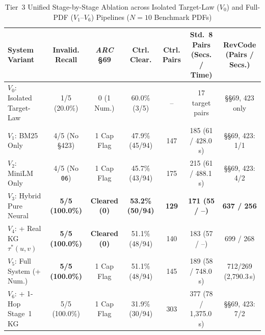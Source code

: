 \begin{table}[htbp]
    \centering
    \scriptsize
    \setlength{\tabcolsep}{2.0pt}
    \renewcommand{\arraystretch}{0.92}
    \caption[Tier 3 Stage-by-Stage Full-PDF Ablation Matrix]{Tier~3 Unified Stage-by-Stage Ablation across Isolated Target-Law ($V_0$) and Full-PDF ($V_1$--$V_6$) Pipelines ($N = 10$ Benchmark PDFs)}
    \label{tab:tier3_ablation_matrix}
    \begin{tabularx}{\linewidth}{>{\RaggedRight\arraybackslash}Xcccccc}
        \toprule
        \textbf{System Variant} & \shortstack[c]{\textbf{Invalid.}\\\textbf{Recall}} & \shortstack[c]{\textbf{\textit{ARC}}\\\textbf{\S69}} & \shortstack[c]{\textbf{Ctrl.}\\\textbf{Clear.}} & \shortstack[c]{\textbf{Ctrl.}\\\textbf{Pairs}} & \shortstack[c]{\textbf{Std.~8 Pairs}\\\textbf{(Secs. / Time)}} & \shortstack[c]{\textbf{RevCode}\\\textbf{(Pairs / Secs.)}} \\
        \midrule
        $V_0$: Isolated Target-Law & 1/5 (20.0\%) & 0 (1 Num.) & 60.0\% (3/5) & -- & 17 target pairs & \S\S69, 423 only \\
        $V_1$: BM25 Only & 4/5 (No \S423) & 1 Cap Flag & 47.9\% (45/94) & 147 & 185 (61 / 428.0\,s) & \S\S69, 423: 1/1 \\
        $V_2$: MiniLM Only & 4/5 (No \texttt{06}) & 1 Cap Flag & 45.7\% (43/94) & 175 & 215 (61 / 488.1\,s) & \S\S69, 423: 4/2 \\
        $V_3$: Hybrid Pure Neural & \textbf{5/5 (100.0\%)} & \textbf{Cleared (0)} & \textbf{53.2\% (50/94)} & \textbf{129} & \textbf{171 (55 / --)} & \textbf{637 / 256} \\
        $V_4$: + Real KG $\tau^*(u,v)$ & \textbf{5/5 (100.0\%)} & \textbf{Cleared (0)} & 51.1\% (48/94) & 140 & 183 (57 / --) & 699 / 268 \\
        $V_5$: Full System (+ Num.) & \textbf{5/5 (100.0\%)} & 1 Cap Flag & 51.1\% (48/94) & 145 & 189 (58 / 748.0\,s) & 712/269 (2,790.3\,s) \\
        $V_6$: + 1-Hop Stage~1 KG & 5/5 (100.0\%) & 1 Cap Flag & 31.9\% (30/94) & 303 & 377 (78 / 1,375.0\,s) & \S\S69, 423: 7/2 \\
        \bottomrule
    \end{tabularx}
\end{table}

